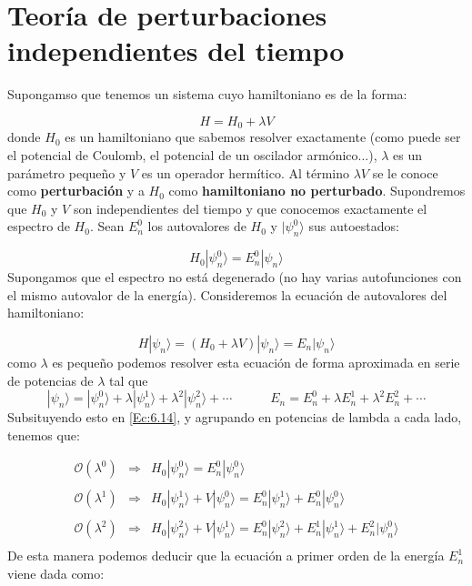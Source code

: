 \documentclass[12pt]{book}
\numberwithin{equation}{chapter}
\numberwithin{figure}{chapter}
\newcommand{\tquad}{\quad \quad \quad}
\begin{document}
\section{Teoría de perturbaciones independientes del tiempo}

Supongamso que tenemos un sistema cuyo hamiltoniano es de la forma:

\begin{equation}
H = H_0 + \lambda V
\end{equation}
donde $H_0$ es un hamiltoniano que sabemos resolver exactamente (como puede ser el potencial de Coulomb, el potencial de un oscilador armónico...), $\lambda$ es un parámetro pequeño y $V$ es un operador hermítico. Al término $\lambda V$ se le conoce como \textbf{perturbación} y a $H_0$ como \textbf{hamiltoniano no perturbado}. Supondremos que $H_0$ y $V$ son independientes del tiempo y que conocemos exactamente el espectro de $H_0$. Sean $E_n^0$ los autovalores de $H_0$ y $|\psi_n^0\rangle$ sus autoestados:

\begin{equation}
H_0 |\psi_n^0\rangle = E_n^0 |\psi_n \rangle 
\end{equation}
Supongamos que el espectro no está degenerado (no hay varias autofunciones con el mismo autovalor de la energía). Consideremos la ecuación de autovalores del hamiltoniano:

\begin{equation}
H|\psi_n\rangle = (H_0+\lambda V)|\psi_n\rangle = E_n |\psi_n\rangle
\label{Ec:6.14}
\end{equation}
como $\lambda$ es pequeño podemos resolver esta ecuación de forma aproximada en serie de potencias de $\lambda$ tal que
\begin{equation}
|\psi_n\rangle = |\psi_n^0\rangle + \lambda |\psi_n^1\rangle + \lambda^2|\psi_n^2\rangle  + \cdots \tquad E_n=E_n^0 + \lambda E_n^1 + \lambda^2 E_n^2 + \cdots 
\end{equation}
Subsituyendo esto en \ref{Ec:6.14}, y agrupando en potencias de lambda a cada lado, tenemos que:

\begin{equation}
\begin{array}{lll}
\mathcal{O}(\lambda^0) & \Longrightarrow & H_0 |\psi_n^0\rangle = E_n^0 |\psi_n^0 \rangle \\ \\

\mathcal{O}(\lambda^1) & \Longrightarrow & H_0 |\psi_n^1\rangle + V |\psi_n^0\rangle = E_n^0 |\psi_n^1 \rangle +  E_n^0|\psi_n^0 \rangle \\ \\

\mathcal{O}(\lambda^2) & \Longrightarrow & H_0 |\psi_n^2\rangle + V|\psi_n^1\rangle   = E_n^0 |\psi_n^2 \rangle + E_n^1 |\psi_n^1 \rangle +
E_n^2 |\psi_n^0 \rangle \\
\end{array}
\end{equation}
De esta manera podemos deducir que la ecuación a primer orden de la energía $E_n^1$ viene dada como:
\end{document}
